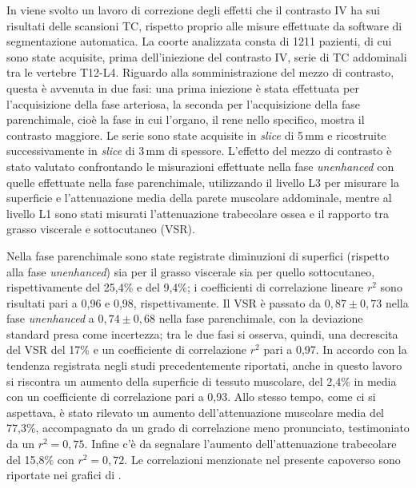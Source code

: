 In \cite{Perez2021} viene svolto un lavoro di correzione degli effetti che il contrasto IV ha sui risultati delle scansioni TC, rispetto proprio alle misure effettuate da software di segmentazione automatica. La coorte analizzata consta di 1211 pazienti, di cui sono state acquisite, prima dell'iniezione del contrasto IV, serie di TC addominali tra le vertebre T12-L4. Riguardo alla somministrazione del mezzo di contrasto, questa è avvenuta in due fasi: una prima iniezione è stata effettuata per l’acquisizione della fase arteriosa, la seconda per l’acquisizione della fase parenchimale, cioè la fase in cui l’organo, il rene nello specifico, mostra il contrasto maggiore. Le serie sono state acquisite in \textit{slice} di 5\,mm e ricostruite successivamente in \textit{slice} di 3\,mm di spessore. L’effetto del mezzo di contrasto è stato valutato confrontando le misurazioni effettuate nella fase \textit{unenhanced} con quelle effettuate nella fase parenchimale, utilizzando il livello L3 per misurare la superficie e l’attenuazione media della parete muscolare addominale, mentre al livello L1 sono stati misurati l’attenuazione trabecolare ossea e il rapporto tra grasso viscerale e sottocutaneo (VSR).

Nella fase parenchimale sono state registrate diminuzioni di superfici (rispetto alla fase \textit{unenhanced}) sia per il grasso viscerale sia per quello sottocutaneo, rispettivamente del 25,4\% e del 9,4\%; i coefficienti di correlazione lineare $r^2$ sono risultati pari a 0,96 e 0,98, rispettivamente. Il VSR è passato da $ 0,87 \pm 0,73 $ nella fase \textit{unenhanced} a $ 0,74 \pm 0,68 $ nella fase parenchimale, con la deviazione standard presa come incertezza; tra le due fasi si osserva, quindi, una decrescita del VSR del 17\% e un coefficiente di correlazione $r^2$ pari a 0,97. In accordo con la tendenza registrata negli studi precedentemente riportati, anche in questo lavoro si riscontra un aumento della superficie di tessuto muscolare, del 2,4\% in media con un coefficiente di correlazione pari a 0,93. Allo stesso tempo, come ci si aspettava, è stato rilevato un aumento dell'attenuazione muscolare media del 77,3\%, accompagnato da un grado di correlazione meno pronunciato, testimoniato da un $r^2 = 0,75$. Infine c’è da segnalare l’aumento dell'attenuazione trabecolare del 15,8\% con $r^2 = 0,72$. Le correlazioni menzionate nel presente capoverso sono riportate nei grafici di .

